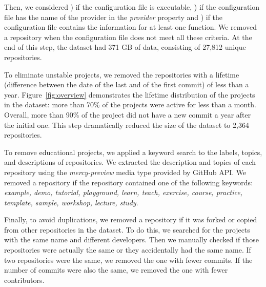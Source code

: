 Then, 
we considered ) if the configuration file is executable, ) if 
the configuration file has the name of the provider in the 
\emph{provider} property and 
) if the configuration file contains the information for at least one 
function. We removed a repository when the configuration file
does not meet all these criteria. 
%
At the end of this step, the dataset had 371 GB of data, consisting 
of 27,812 unique repositories. 

To eliminate unstable projects, we removed the repositories with a lifetime 
(difference between the date of the last and of the first commit)
of less than a year. 
Figure~\ref{fig:overview} demonstrates the lifetime distribution of the 
projects in the dataset: more than 70\% of the projects 
were active for less than a month. Overall, more than 90\% 
of the project did not have a new commit a year after the initial one. 
This step dramatically reduced the size of the dataset to 2,364 
repositories.

To remove educational projects, 
we applied a keyword search to the labels, topics, and 
descriptions of repositories. We extracted the description 
and topics of each repository using the \emph{mercy-preview} media 
type provided by GitHub API. We removed a repository 
if the repository contained one of the following keywords: 
\emph{example, demo, tutorial, playground, learn, teach, exercise, 
	course, practice, template, sample, workshop, lecture, study}.

Finally, to avoid duplications, we removed a repository if it was forked 
or copied from other repositories in the dataset. To do this, we 
searched for the projects with the same name and different developers. 
Then we manually checked if those repositories were actually the same or 
they accidentally had the same name. If two repositories were the same, 
we removed the one with fewer commits. If the number of commits were 
also the same, we removed the one with fewer contributors.





